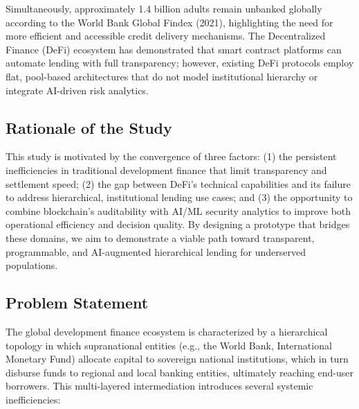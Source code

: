 \documentclass[11pt,a4paper]{article}
\begin{document}
Simultaneously, approximately 1.4 billion adults remain unbanked globally according to the World Bank Global Findex (2021), highlighting the need for more efficient and accessible credit delivery mechanisms. The Decentralized Finance (DeFi) ecosystem has demonstrated that smart contract platforms can automate lending with full transparency; however, existing DeFi protocols employ flat, pool-based architectures that do not model institutional hierarchy or integrate AI-driven risk analytics.

\subsection{Rationale of the Study}

This study is motivated by the convergence of three factors: (1) the persistent inefficiencies in traditional development finance that limit transparency and settlement speed; (2) the gap between DeFi's technical capabilities and its failure to address hierarchical, institutional lending use cases; and (3) the opportunity to combine blockchain's auditability with AI/ML security analytics to improve both operational efficiency and decision quality. By designing a prototype that bridges these domains, we aim to demonstrate a viable path toward transparent, programmable, and AI-augmented hierarchical lending for underserved populations.

\subsection{Problem Statement}

The global development finance ecosystem is characterized by a hierarchical topology in which supranational entities (e.g., the World Bank, International Monetary Fund) allocate capital to sovereign national institutions, which in turn disburse funds to regional and local banking entities, ultimately reaching end-user borrowers. This multi-layered intermediation introduces several systemic inefficiencies:
\end{document}
